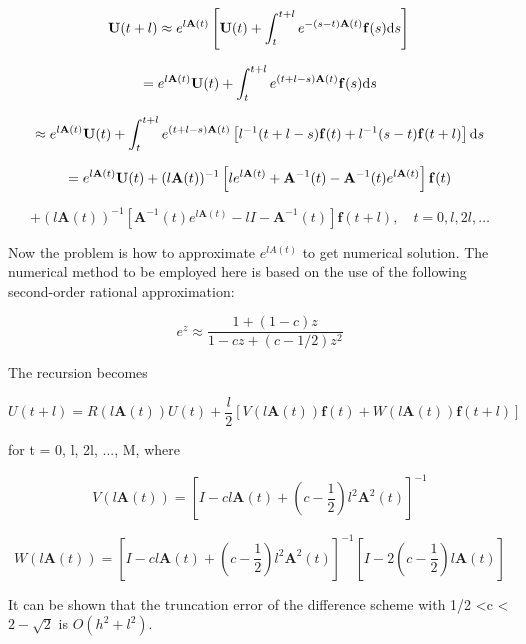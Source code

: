 $$
\mathbf{U}(t+l) \approx e^{l \mathbf{A}(t)}\left[\mathbf{U}(t)+\int_{t}^{t+l} e^{-(s-t) \mathbf{A}(t)} \mathbf{f}(s) \mathrm{d} s\right] \\
$$

$$
= e^{l \mathbf{A}(t)} \mathbf{U}(t)+\int_{t}^{t+l} e^{(t+l-s) \mathbf{A}(t)} \mathbf{f}(s) \mathrm{d} s \\
$$

$$
\approx e^{l \mathbf{A}(t)} \mathbf{U}(t)+\int_{t}^{t+l} e^{(t+l-s) \mathbf{A}(t)}\left[l^{-1}(t+l-s) \mathbf{f}(t)+
l^{-1}(s-t) \mathbf{f}(t+l)\right] \mathrm{d} s \\
$$

$$
= e^{l \mathbf{A}(t)} \mathbf{U}(t)+(l \mathbf{A}(t))^{-1}\left[l e^{l \mathbf{A}(t)}+\mathbf{A}^{-1}(t)-\mathbf{A}^{-1}(t) e^{l \mathbf{A}(t)}\right] \mathbf{f}(t) \\
$$

$$
+(l \mathbf{A}(t))^{-1}\left[\mathbf{A}^{-1}(t) e^{l \mathbf{A}(t)}-l I-\mathbf{A}^{-1}(t)\right] \mathbf{f}(t+l), \quad t=0, l, 2 l, \ldots
$$

Now the problem is how to approximate $e^{lA(t)}$ to get numerical solution. The numerical method to be employed here is based on the use of the following second-order rational approximation:

$$
e^{z} \approx \frac{1+(1-c) z}{1-c z+(c-1 / 2) z^{2}}
$$

The recursion becomes

$$
U(t+l)=R(l \mathbf{A}(t)) U(t)+\frac{l}{2}[V(l \mathbf{A}(t)) \mathbf{f}(t)+W(l \mathbf{A}(t)) \mathbf{f}(t+l)]
$$

for t = 0, l, 2l, ..., M, where

$$
V(l \mathbf{A}(t))=\left[I-c l \mathbf{A}(t)+\left(c-\frac{1}{2}\right) l^{2} \mathbf{A}^{2}(t)\right]^{-1}
$$

$$
W(l \mathbf{A}(t))=\left[I-c l \mathbf{A}(t)+\left(c-\frac{1}{2}\right) l^{2} \mathbf{A}^{2}(t)\right]^{-1}\left[I-2\left(c-\frac{1}{2}\right) l \mathbf{A}(t)\right]
$$

It can be shown that the truncation error of the difference scheme with 1/2 \textless c \textless $2-\sqrt{2}$ is $O(h^2 + l^2)$.
